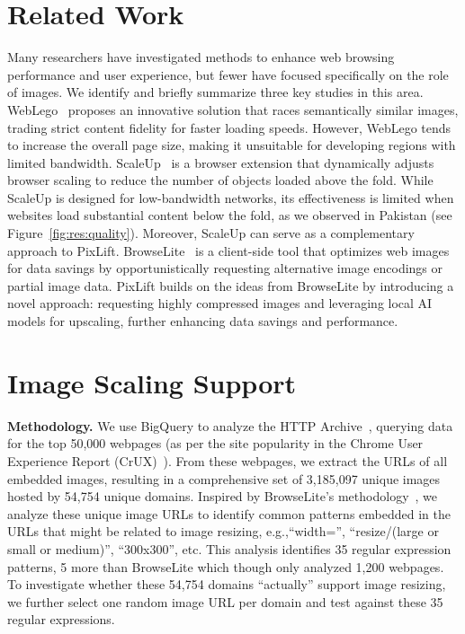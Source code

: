 \documentclass[acmsmall]{acmart}
\newcommand{\tool}{{PixLift}\xspace}
\newcommand{\eg}{{e.g.,}\xspace}
\begin{document}
\section{Related Work}
\label{sec:related}
Many researchers have investigated methods to enhance web browsing performance and user experience, but fewer have focused specifically on the role of images. We identify and briefly summarize three key studies in this area. WebLego~\cite{webLego} proposes an innovative solution that races semantically similar images, trading strict content fidelity for faster loading speeds. However, WebLego tends to increase the overall page size, making it unsuitable for developing regions with limited bandwidth. ScaleUp~\cite{newman2019scaling} is a browser extension that dynamically adjusts browser scaling to reduce the number of objects loaded above the fold. While ScaleUp is designed for low-bandwidth networks, its effectiveness is limited when websites load substantial content below the fold, as we observed in Pakistan (see Figure~\ref{fig:res:quality}). Moreover, ScaleUp can serve as a complementary approach to \tool. BrowseLite~\cite{browseLite} is a client-side tool that optimizes web images for data savings by opportunistically requesting alternative image encodings or partial image data. \tool builds on the ideas from BrowseLite by introducing a novel approach: requesting highly compressed images and leveraging local AI models for upscaling, further enhancing data savings and performance.

\section{Image Scaling Support} 
\label{sec:scaling} 

\vspace{0.05in}
\noindent
\textbf{Methodology.} We use BigQuery to analyze the HTTP Archive~\cite{harBigQuery}, querying data for the top 50,000 webpages (as per the site popularity in the Chrome User Experience Report (CrUX)~\cite{google_crux}). From these webpages, we extract the URLs of all embedded images, resulting in a comprehensive set of 3,185,097 unique images hosted by 54,754 unique domains. Inspired by BrowseLite's methodology~\cite{browseLite}, we analyze these unique image URLs to identify common patterns embedded in the URLs that might be related to image resizing, \eg ``width='', ``resize/(large or small or medium)'', ``300x300'', etc. This analysis identifies 35 regular expression patterns, 5 more than BrowseLite which though only analyzed 1,200 webpages.  To investigate whether these 54,754 domains ``actually'' support image resizing, we further select one random image URL per domain and test against these 35 regular expressions. 
\end{document}
